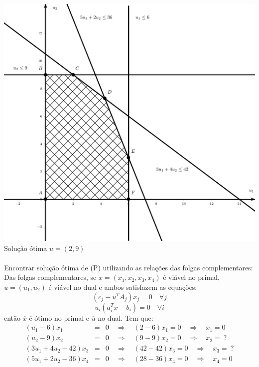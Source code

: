 \documentclass[12pt]{exam}
\begin{document}
\begin{questions}
\begin{solution}
	\includegraphics[scale=0.7]{img/dualSol.pdf} \\ 
	Solução ótima $u = (2,9)$
	\\ \ \\
	Encontrar solução ótima de (P) utilizando as relações das folgas complementares: \\ 
Das folgas complementares, se $x = (x_1, x_2,x_3,x_4)$ é viável no primal, $u = (u_1, u_2)$ é viável no dual e ambos satisfazem as equações:
	$$(c_j - u^TA_j) x_j = 0 \quad \forall j $$
	$$ u_i(a_{i}^Tx - b_i) = 0 \quad \forall i $$
	então $\overline{x}$ é ótimo no primal e $\overline{u}$ no dual. Tem que: 
	\begin{equation*}	
	\begin{array}{rcl}
	(u_1 - 6)x_1 & = & 0   \quad \Rightarrow  \quad  (2 - 6)x_1 = 0  \quad \Rightarrow  \quad  x_1 = 0\\
	(u_2 - 9)x_2 & = & 0  \quad \Rightarrow  \quad (9 - 9)x_2 = 0  \quad \Rightarrow  \quad x_2 =~?\\
	(3u_1 + 4u_2 - 42)x_3 & = & 0 \quad \Rightarrow  \quad (42 - 42)x_3 = 0 \quad \Rightarrow  \quad  x_3 =~?\\
	(5u_1 + 2u_2 - 36)x_4 & = & 0   \quad \Rightarrow  \quad   (28 - 36)x_4 = 0 \quad \Rightarrow  \quad x_4 = 0 \\
	\end{array}
	\end{equation*}	

\end{solution}
\end{questions}
\end{document}
